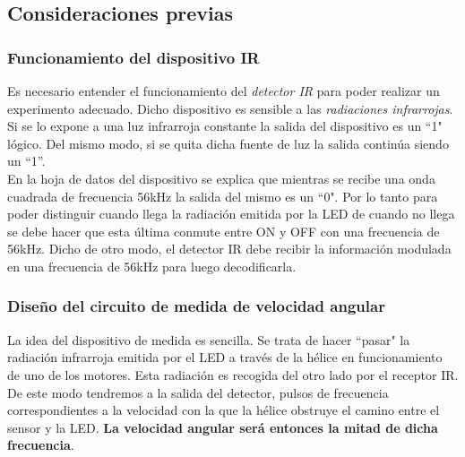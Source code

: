 \documentclass[spanish,12pt,a4paper,titlepage]{report}
\begin{document}
\subsection{Consideraciones previas}
\subsubsection*{Funcionamiento del dispositivo IR}
Es necesario entender el funcionamiento del \emph{detector IR} para poder realizar un experimento adecuado. Dicho dispositivo es sensible a las \emph{radiaciones infrarrojas}. Si se lo expone a una luz infrarroja constante la salida del dispositivo es un ``1" lógico. Del mismo modo, si se quita dicha fuente de luz la salida continúa siendo un ``1''. \\

En la hoja de datos del dispositivo se explica que mientras se recibe una onda cuadrada de frecuencia 56kHz la salida del mismo es un ``0". Por lo tanto para poder distinguir cuando llega la radiación emitida por la LED de cuando no llega se debe hacer que esta última conmute entre ON y OFF con una frecuencia de 56kHz. Dicho de otro modo, el detector IR debe recibir la información modulada en una frecuencia de 56kHz para luego decodificarla.

\subsubsection*{Diseño del circuito de medida de velocidad angular}

La idea del dispositivo de medida es sencilla. Se trata de hacer ``pasar" la radiación infrarroja emitida por el LED a través de la hélice en funcionamiento de uno de los motores. Esta radiación es recogida del otro lado por el receptor IR.\\

De este modo tendremos a la salida del detector, pulsos de frecuencia correspondientes a la velocidad con la que la hélice obstruye el camino entre el sensor y la LED. \textbf{La velocidad angular será entonces la mitad de dicha frecuencia}.\\ 
\end{document}
